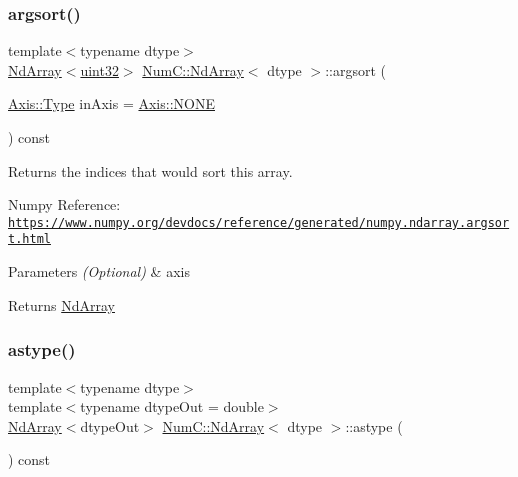 \subsubsection{\texorpdfstring{argsort()}{argsort()}}
{\footnotesize\ttfamily template$<$typename dtype$>$ \\
\mbox{\hyperlink{class_num_c_1_1_nd_array}{Nd\+Array}}$<$\mbox{\hyperlink{namespace_num_c_ae685802ca6d3035f2b400b081e3953fa}{uint32}}$>$ \mbox{\hyperlink{class_num_c_1_1_nd_array}{Num\+C\+::\+Nd\+Array}}$<$ dtype $>$\+::argsort (\begin{DoxyParamCaption}\item[{\mbox{\hyperlink{struct_num_c_1_1_axis_a8e689044ef1941a03482e730c5e7ebb3}{Axis\+::\+Type}}}]{in\+Axis = {\ttfamily \mbox{\hyperlink{struct_num_c_1_1_axis_a8e689044ef1941a03482e730c5e7ebb3a0ae033c4226f7184bf0050b101e7ed94}{Axis\+::\+N\+O\+NE}}} }\end{DoxyParamCaption}) const\hspace{0.3cm}{\ttfamily [inline]}}

Returns the indices that would sort this array.

Numpy Reference\+: \href{https://www.numpy.org/devdocs/reference/generated/numpy.ndarray.argsort.html}{\tt https\+://www.\+numpy.\+org/devdocs/reference/generated/numpy.\+ndarray.\+argsort.\+html}


\begin{DoxyParams}{Parameters}
{\em (\+Optional)} & axis \\
\hline
\end{DoxyParams}
\begin{DoxyReturn}{Returns}
\mbox{\hyperlink{class_num_c_1_1_nd_array}{Nd\+Array}} 
\end{DoxyReturn}
\mbox{\label{class_num_c_1_1_nd_array_a03c8719dffd012fa234b4ae2feae2ed2}} 
\subsubsection{\texorpdfstring{astype()}{astype()}}
{\footnotesize\ttfamily template$<$typename dtype$>$ \\
template$<$typename dtype\+Out  = double$>$ \\
\mbox{\hyperlink{class_num_c_1_1_nd_array}{Nd\+Array}}$<$dtype\+Out$>$ \mbox{\hyperlink{class_num_c_1_1_nd_array}{Num\+C\+::\+Nd\+Array}}$<$ dtype $>$\+::astype (\begin{DoxyParamCaption}{ }\end{DoxyParamCaption}) const\hspace{0.3cm}{\ttfamily [inline]}}


